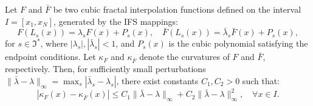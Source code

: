 \documentclass[10pt,a4paper]{amsart}
\begin{document}
	\begin{theorem}
		Let \( F \) and \( \bar{F} \) be two cubic fractal interpolation functions defined on the interval \( I = [x_1, x_N] \), generated by the IFS mappings:
		\[
		F(L_s(x)) = \lambda_s F(x) + P_s(x), \quad \bar{F}(L_s(x)) = \bar{\lambda}_s \bar{F}(x) + P_s(x),
		\]
		for \( s \in \Im^* \), where \( |\lambda_s|, |\bar{\lambda}_s| < 1 \), and \( P_s(x) \) is the cubic polynomial satisfying the endpoint conditions. Let \( \kappa_F \) and \( \kappa_{\bar{F}} \) denote the curvatures of \( F \) and \( \bar{F} \), respectively. Then, for sufficiently small perturbations \( \|\bar{\lambda} - \lambda\|_\infty = \max_s |\bar{\lambda}_s - \lambda_s| \), there exist constants \( C_1, C_2 > 0 \) such that:
		\[
		|\kappa_F(x) - \kappa_{\bar{F}}(x)| \leq C_1 \|\bar{\lambda} - \lambda\|_\infty + C_2 \|\bar{\lambda} - \lambda\|_\infty^2, \quad \forall x \in I.
		\]
	\end{theorem}
\end{document}
